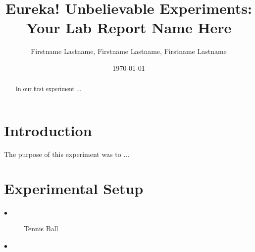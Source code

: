 \documentclass[12pt]{article}
\begin{document}
\title{Eureka! Unbelievable Experiments: Your Lab Report Name Here} 
\author{Firstname Lastname, Firstname Lastname, Firstname Lastname} 

\date{\today}  

\maketitle

\begin{abstract} 
	In our first experiment ...
\end{abstract}
    
\section{Introduction}

The purpose of this experiment was to ...

\section{Experimental Setup}
 
\begin{description}
  \item[$\bullet$] Tennis Ball
  \item[$\bullet$] 
\end{description}
\end{document}
